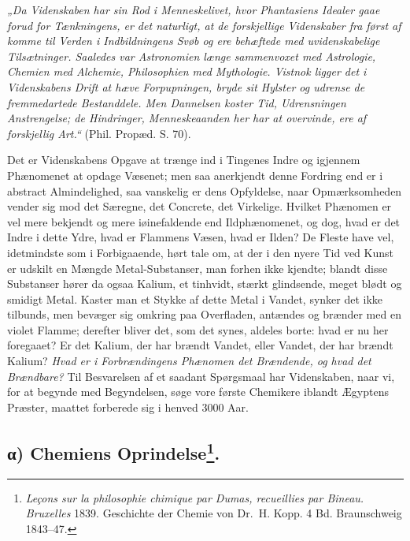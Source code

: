 \documentclass[12pt,a4paper]{book}
\begin{document}
\emph{„Da Videnskaben har sin Rod i Menneskelivet,
hvor Phantasiens Idealer gaae forud for Tænkningens,
er det naturligt, at de forskjellige Videnskaber
fra først af komme til Verden i Indbildningens
Svøb og ere behæftede med uvidenskabelige
Tilsætninger. Saaledes var Astronomien
længe sammenvoxet med Astrologie, Chemien med
Alchemie, Philosophien med Mythologie. Vistnok
ligger det i Videnskabens Drift at hæve Forpupningen,
bryde sit Hylster og udrense de fremmedartede
Bestanddele. Men Dannelsen koster Tid,
Udrensningen Anstrengelse; de Hindringer, Menneskeaanden
her har at overvinde, ere af forskjellig
Art.“} (Phil. Propæd. S. 70).

Det er Videnskabens Opgave at trænge ind i Tingenes
Indre og igjennem Phænomenet at opdage Væsenet; men saa
anerkjendt denne Fordring end er i abstract Almindelighed,
saa vanskelig er dens Opfyldelse, naar Opmærksomheden vender
sig mod det Særegne, det Concrete, det Virkelige. Hvilket
Phænomen er vel mere bekjendt og mere iøinefaldende end
Ildphænomenet, og dog, hvad er det Indre i dette Ydre,
hvad er Flammens Væsen, hvad er Ilden? De Fleste have
vel, idetmindste som i Forbigaaende, hørt tale om, at der i
den nyere Tid ved Kunst er udskilt en Mængde Metal-Substanser,
man forhen ikke kjendte; blandt disse Substanser
hører da ogsaa Kalium, et tinhvidt, stærkt glindsende, meget
\setcounter{footnote}{0}
blødt og smidigt Metal. Kaster man et Stykke af dette
Metal i Vandet, synker det ikke tilbunds, men bevæger sig
omkring paa Overfladen, antændes og brænder med en violet
Flamme; derefter bliver det, som det synes, aldeles borte:
hvad er nu her foregaaet? Er det Kalium, der har brændt
Vandet, eller Vandet, der har brændt Kalium? \emph{Hvad er i
Forbrændingens Phænomen det Brændende, og
hvad det Brændbare?} Til Besvarelsen af et saadant
Spørgsmaal har Videnskaben, naar vi, for at begynde med
Begyndelsen, søge vore første Chemikere iblandt Ægyptens
Præster, maattet forberede sig i henved 3000 Aar.

\subsection*{α) Chemiens Oprindelse\protect\footnote{\textit{Leçons
sur la philosophie chimique par Dumas, recueillies par
Bineau.} \textit{Bruxelles} 1839. Geschichte der Chemie von
Dr.~H. Kopp. 4 Bd. Braunschweig 1843--47.}.}
\end{document}
